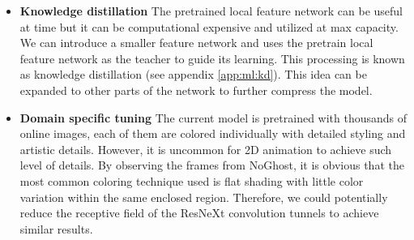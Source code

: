 \begin{itemize}
    \item \textbf{Knowledge distillation} The pretrained local feature network can be useful at time but it can be computational expensive and utilized at max capacity. We can introduce a smaller feature network and uses the pretrain local feature network as the teacher to guide its learning. This processing is known as knowledge distillation (see appendix \ref{app:ml:kd}). This idea can be expanded to other parts of the network to further compress the model.
    \item \textbf{Domain specific tuning} The current model is pretrained with thousands of online images, each of them are colored individually with detailed styling and artistic details. However, it is uncommon for 2D animation to achieve such level of details. By observing the frames from NoGhost, it is obvious that the most common coloring technique used is flat shading with little color variation within the same enclosed region. Therefore, we could potentially reduce the receptive field of the ResNeXt convolution tunnels to achieve similar results.
\end{itemize}


